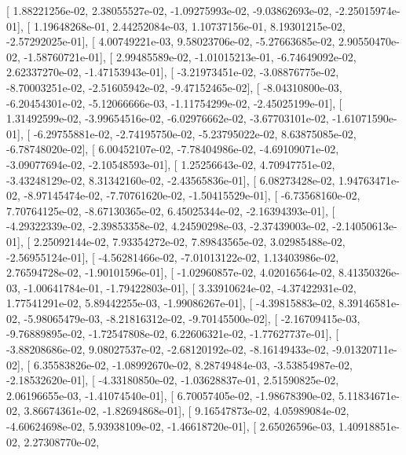 \documentclass{article}
\begin{document}
       [  1.88221256e-02,   2.38055527e-02,  -1.09275993e-02,
         -9.03862693e-02,  -2.25015974e-01],
       [  1.19648268e-01,   2.44252084e-03,   1.10737156e-01,
          8.19301215e-02,  -2.57292025e-01],
       [  4.00749221e-03,   9.58023706e-02,  -5.27663685e-02,
          2.90550470e-02,  -1.58760721e-01],
       [  2.99485589e-02,  -1.01015213e-01,  -6.74649092e-02,
          2.62337270e-02,  -1.47153943e-01],
       [ -3.21973451e-02,  -3.08876775e-02,  -8.70003251e-02,
         -2.51605942e-02,  -9.47152465e-02],
       [ -8.04310800e-03,  -6.20454301e-02,  -5.12066666e-03,
         -1.11754299e-02,  -2.45025199e-01],
       [  1.31492599e-02,  -3.99654516e-02,  -6.02976662e-02,
         -3.67703101e-02,  -1.61071590e-01],
       [ -6.29755881e-02,  -2.74195750e-02,  -5.23795022e-02,
          8.63875085e-02,  -6.78748020e-02],
       [  6.00452107e-02,  -7.78404986e-02,  -4.69109071e-02,
         -3.09077694e-02,  -2.10548593e-01],
       [  1.25256643e-02,   4.70947751e-02,  -3.43248129e-02,
          8.31342160e-02,  -2.43565836e-01],
       [  6.08273428e-02,   1.94763471e-02,  -8.97145474e-02,
         -7.70761620e-02,  -1.50415529e-01],
       [ -6.73568160e-02,   7.70764125e-02,  -8.67130365e-02,
          6.45025344e-02,  -2.16394393e-01],
       [ -4.29322339e-02,  -2.39853358e-02,   4.24590298e-03,
         -2.37439003e-02,  -2.14050613e-01],
       [  2.25092144e-02,   7.93354272e-02,   7.89843565e-02,
          3.02985488e-02,  -2.56955124e-01],
       [ -4.56281466e-02,  -7.01013122e-02,   1.13403986e-02,
          2.76594728e-02,  -1.90101596e-01],
       [ -1.02960857e-02,   4.02016564e-02,   8.41350326e-03,
         -1.00641784e-01,  -1.79422803e-01],
       [  3.33910624e-02,  -4.37422931e-02,   1.77541291e-02,
          5.89442255e-03,  -1.99086267e-01],
       [ -4.39815883e-02,   8.39146581e-02,  -5.98065479e-03,
         -8.21816312e-02,  -9.70145500e-02],
       [ -2.16709415e-03,  -9.76889895e-02,  -1.72547808e-02,
          6.22606321e-02,  -1.77627737e-01],
       [ -3.88208686e-02,   9.08027537e-02,  -2.68120192e-02,
         -8.16149433e-02,  -9.01320711e-02],
       [  6.35583826e-02,  -1.08992670e-02,   8.28749484e-03,
         -3.53854987e-02,  -2.18532620e-01],
       [ -4.33180850e-02,  -1.03628837e-01,   2.51590825e-02,
          2.06196655e-03,  -1.41074540e-01],
       [  6.70057405e-02,  -1.98678390e-02,   5.11834671e-02,
          3.86674361e-02,  -1.82694868e-01],
       [  9.16547873e-02,   4.05989084e-02,  -4.60624698e-02,
          5.93938109e-02,  -1.46618720e-01],
       [  2.65026596e-03,   1.40918851e-02,   2.27308770e-02,
\end{document}
